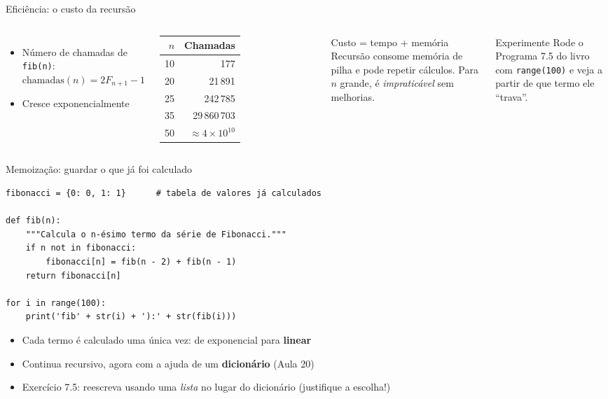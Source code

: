 \documentclass[aspectratio=169,10pt,t]{beamer}
\begin{document}
\begin{frame}[fragile]{Eficiência: o custo da recursão}
  \begin{columns}[T]
    \begin{itemize}
      \item Número de chamadas de \texttt{fib(n)}:\\
            \(\text{chamadas}(n) = 2F_{n+1}-1\)
      \item Cresce \alert{exponencialmente}
    \end{itemize}
    \centering\small
    \begin{tabular}{rr}
      \toprule
      \(n\) & Chamadas\\
      \midrule
      10 & 177\\
      20 & 21\,891\\
      25 & 242\,785\\
      35 & 29\,860\,703\\
      50 & \(\approx 4\times10^{10}\)\\
      \bottomrule
    \end{tabular}
    \begin{block}{Custo = tempo + memória}
      Recursão consome memória de pilha e pode repetir cálculos. Para \(n\) grande, é \emph{impraticável} sem melhorias.
    \end{block}
    \begin{alertblock}{Experimente}
      Rode o Programa 7.5 do livro com \texttt{range(100)} e veja a partir de que termo ele ``trava''.
    \end{alertblock}
  \end{columns}
\end{frame}

\begin{frame}[fragile]{Memoização: guardar o que já foi calculado}
\begin{lstlisting}[basicstyle=\ttfamily\scriptsize]
fibonacci = {0: 0, 1: 1}      # tabela de valores já calculados

def fib(n):
    """Calcula o n-ésimo termo da série de Fibonacci."""
    if n not in fibonacci:
        fibonacci[n] = fib(n - 2) + fib(n - 1)
    return fibonacci[n]

for i in range(100):
    print('fib' + str(i) + '):' + str(fib(i)))
\end{lstlisting}
  \begin{itemize}
    \item Cada termo é calculado \alert{uma única vez}: de exponencial para \textbf{linear}
    \item Continua recursivo, agora com a ajuda de um \textbf{dicionário} (Aula 20)
    \item Exercício 7.5: reescreva usando uma \emph{lista} no lugar do dicionário (justifique a escolha!)
  \end{itemize}
\end{frame}
\end{document}
